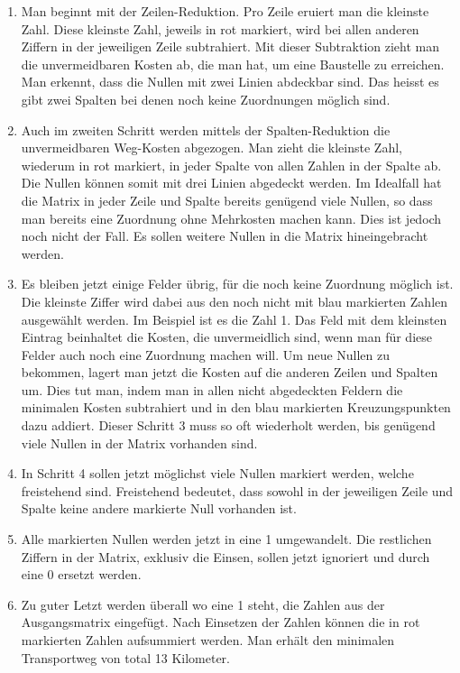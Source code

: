 \begin{enumerate}
\item Man beginnt mit der Zeilen-Reduktion. Pro Zeile eruiert man die kleinste Zahl. Diese kleinste Zahl, jeweils in rot markiert, wird bei allen anderen Ziffern in der jeweiligen Zeile subtrahiert. Mit dieser Subtraktion zieht man die unvermeidbaren Kosten ab, die man hat, um eine Baustelle zu erreichen. Man erkennt, dass die Nullen mit zwei Linien abdeckbar sind. Das heisst es gibt zwei Spalten bei denen noch keine Zuordnungen möglich sind. 

\item Auch im zweiten Schritt werden mittels der Spalten-Reduktion die unvermeidbaren Weg-Kosten abgezogen. Man zieht die kleinste Zahl, wiederum in rot markiert, in jeder Spalte von allen Zahlen in der Spalte ab.
Die Nullen können somit mit drei Linien abgedeckt werden. Im Idealfall hat die Matrix in jeder Zeile und Spalte bereits genügend viele Nullen, so dass man bereits eine Zuordnung ohne Mehrkosten machen kann. Dies ist jedoch noch nicht der Fall. Es sollen weitere Nullen in die Matrix hineingebracht werden.

\item Es bleiben jetzt einige Felder übrig, für die noch keine Zuordnung möglich ist. Die kleinste Ziffer wird dabei aus den noch nicht mit blau markierten Zahlen ausgewählt werden. Im Beispiel ist es die Zahl 1. Das Feld mit dem kleinsten Eintrag beinhaltet die Kosten, die unvermeidlich sind, wenn man für diese Felder auch noch eine Zuordnung machen will. Um neue Nullen zu bekommen, lagert man jetzt die Kosten auf die anderen Zeilen und Spalten um. Dies tut man, indem man in allen nicht abgedeckten Feldern die minimalen Kosten subtrahiert und in den blau markierten Kreuzungspunkten dazu addiert.
Dieser Schritt 3 muss so oft wiederholt werden, bis genügend viele Nullen in der Matrix vorhanden sind.

\item In Schritt 4 sollen jetzt möglichst viele Nullen markiert werden, welche freistehend sind.
Freistehend bedeutet, dass sowohl in der jeweiligen Zeile und Spalte keine andere markierte Null vorhanden ist.

\item Alle markierten Nullen werden jetzt in eine 1 umgewandelt. Die restlichen Ziffern in der Matrix, exklusiv die Einsen, sollen jetzt ignoriert und durch eine 0 ersetzt werden.

\item Zu guter Letzt werden überall wo eine 1 steht, die Zahlen aus der Ausgangsmatrix eingefügt. Nach Einsetzen der Zahlen können die in rot markierten Zahlen aufsummiert werden. Man erhält den minimalen Transportweg von total 13 Kilometer.
\end{enumerate}

